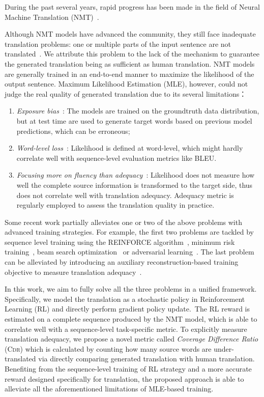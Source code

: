 \documentclass[letterpaper]{article} \usepackage{aaai19}  \usepackage{times}  \usepackage{helvet}  \usepackage{courier}  \usepackage{url}  \usepackage{graphicx}  \frenchspacing  \setlength{\pdfpagewidth}{8.5in}  \setlength{\pdfpageheight}{11in}  \usepackage{amsmath}
\begin{document}
During the past several years, rapid progress has been made in the field of Neural Machine Translation (NMT)~\cite{kalchbrenner2013recurrent,sutskever2014sequence,bahdanau2014neural,gehring2017convolutional,Wu:2016:arXiv,vaswani2017attention}. 

Although NMT models have advanced the community, they still face inadequate translation problems: one or multiple parts of the input sentence are not translated~\cite{tu2016modeling}. We attribute this problem to the lack of the mechanism to guarantee the generated translation being as sufficient as human translation. 
NMT models are generally trained in an end-to-end manner to maximize the likelihood of the output sentence.
Maximum Likelihood Estimation (MLE), however, could not judge the real quality of generated translation due to its several limitations： \begin{enumerate}
    \item {\em Exposure bias}~\cite{Ranzato:2016:ICLR}: The models are trained on the groundtruth data distribution, but at test time are used to generate target words based on previous model predictions, which can be erroneous;
    \item {\em Word-level loss}~\cite{Shen:2016:ACL}: Likelihood is defined at word-level, which might hardly correlate well with sequence-level evaluation metrics like BLEU. \item {\em Focusing more on fluency than adequacy}~\cite{Tu:2017:AAAI}: Likelihood does not measure how well the complete source information is transformed to the target side, thus does not correlate well with translation adequacy. Adequacy metric is regularly employed to assess the translation quality in practice. 
\end{enumerate}


Some recent work partially alleviates one or two of the above problems with advanced training strategies.
For example, the first two problems are tackled by sequence level training using the REINFORCE algorithm~\cite{Ranzato:2016:ICLR,bahdanau2016actor}, minimum risk training~\cite{Shen:2016:ACL}, beam search optimization~\cite{Wiseman:2016:EMNLP} or adversarial learning~\cite{wu2017adversarial,Yang:2018:NAACL}. The last problem can be alleviated by introducing an auxiliary reconstruction-based training objective to measure translation adequacy~\cite{Tu:2017:AAAI}. 


In this work, we aim to fully solve all the three problems in a unified framework. Specifically, we model the translation as a stochastic policy in Reinforcement Learning (RL) and directly perform gradient policy update.~The RL reward is estimated on a complete sequence produced by the NMT model, which is able to correlate well with a sequence-level task-specific metric. To explicitly measure translation adequacy, we propose a novel metric called {\em Coverage Difference Ratio} (\textsc{Cdr}) which is calculated by counting how many source words are under-translated via directly comparing generated translation with human translation.
Benefiting from the sequence-level training of RL strategy and a more accurate reward designed specifically for translation, the proposed approach is able to alleviate all the aforementioned limitations of MLE-based training.
\end{document}
